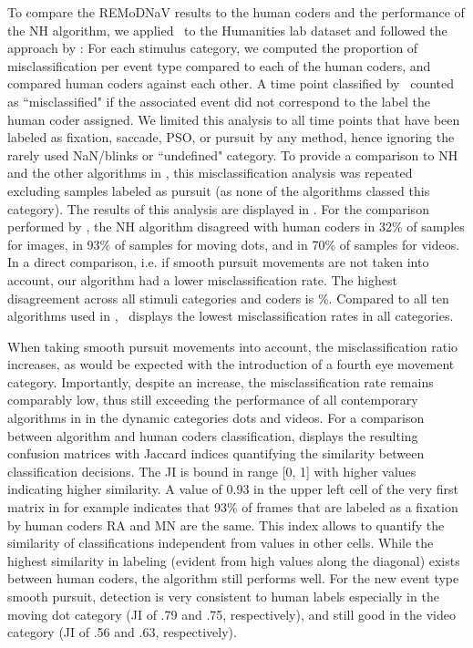 To compare the REMoDNaV results to the human coders and the performance of the
NH algorithm, we applied \remodnav\ to the Humanities lab dataset and followed
the approach by \citet{Andersson2017}: For each stimulus category, we
computed the proportion of misclassification per event type compared to each of
the human coders, and compared human coders against each other. A time point
classified by \remodnav\ counted as ``misclassified" if the associated event did
not correspond to the label the human coder assigned. We limited this analysis
to all time points that have been labeled as fixation, saccade, PSO, or pursuit
by any method, hence ignoring the rarely used NaN/blinks or ``undefined"
category. To provide a comparison to NH and the other algorithms in
\cite{Andersson2017}, this misclassification analysis was repeated excluding
samples labeled as pursuit (as none of the algorithms classed this category).
The results of this analysis are displayed in . For the
comparison performed by \citet{Andersson2017}, the NH algorithm disagreed with
human coders in 32\% of samples for images, in 93\% of samples for moving dots,
and in 70\% of samples for videos. In a direct comparison, i.e. if smooth
pursuit movements are not taken into account, our algorithm had a lower
misclassification rate. The highest disagreement across all stimuli categories
and coders is \maxmclf\%. Compared to all ten algorithms used in
\citet{Andersson2017}, \remodnav\ displays the lowest misclassification rates in
all categories.

When taking smooth pursuit movements into account, the misclassification ratio
increases, as would be expected with the introduction of a fourth eye movement
category. Importantly, despite an increase, the misclassification rate remains
comparably low, thus still exceeding the performance of all contemporary
algorithms in \citet{Andersson2017} in the dynamic categories dots and videos.
For a comparison between algorithm and human coders classification, 
displays the resulting confusion matrices with Jaccard indices
\citep[JI; ][]{jaccard1901etude} quantifying the similarity between
classification decisions. The JI is bound in range [0, 1] with higher values
indicating higher similarity. A value of 0.93 in the upper left cell of the
very first matrix in  for example indicates that 93\% of frames that
are labeled as a fixation by human coders RA and MN are the same. This index
allows to quantify the similarity of classifications independent from values in
other cells. While the highest similarity in labeling (evident from high values
along the diagonal) exists between human coders, the algorithm still performs
well. For the new event type smooth pursuit, detection is very consistent to
human labels especially in the moving dot category (JI of .79 and .75,
respectively), and still good in the video category (JI of .56 and .63,
respectively).  

